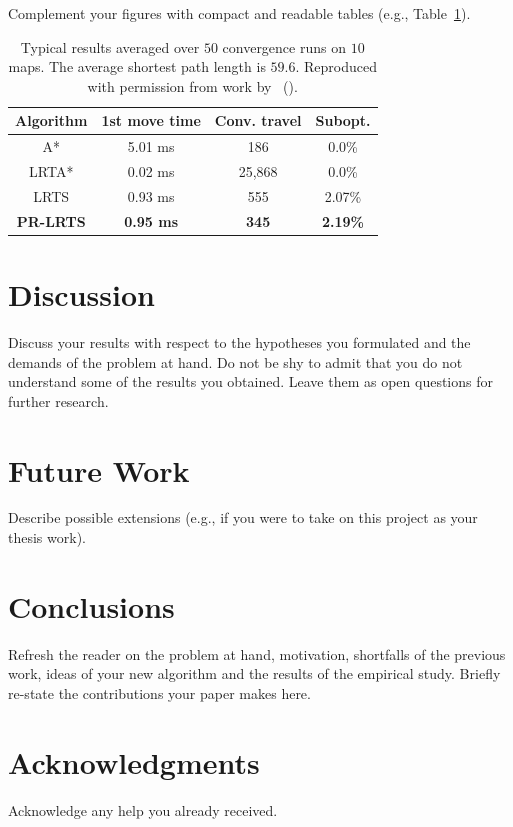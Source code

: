 \documentclass[letterpaper]{article}
\newcommand{\citea}[1]{\citeauthor{#1} (\citeyear{#1})}
\numberwithin{equation}{section}
\numberwithin{theorem}{section}
\numberwithin{lemma}{section}
\numberwithin{df}{section}
\begin{document}
Complement your figures with compact and readable tables (e.g., Table~\ref{tab:PRLRTS-cummulative}). 

\begin{table}[t]
\caption{\small Typical results averaged over $50$ convergence runs on $10$ maps. The average shortest path length is $59.6$. Reproduced with permission from work by~\citea{Bulitko:05b}.}\label{tab:PRLRTS-cummulative}
\vspace{0.1cm}
{\small \begin{center}
\begin{tabular}{c|c|c|c}
\hline
 Algorithm & 1st move time & Conv. travel & Subopt. \\ \hline
A* & 5.01 ms & 186 & 0.0\% \\
LRTA* & 0.02 ms & 25,868 &  0.0\% \\
LRTS & 0.93 ms & 555 &  2.07\% \\
{\bf PR-LRTS} & {\bf 0.95 ms} & {\bf 345} & {\bf 2.19\%} \\
\hline
\end{tabular}
\end{center}}
\end{table}



\section{Discussion}

Discuss your results with respect to the hypotheses you formulated and the demands of the problem at hand. Do not be shy to admit that you do not understand some of the results you obtained. Leave them as open questions for further research. 

\section{Future Work}

Describe possible extensions (e.g., if you were to take on this project as your thesis work).

\section{Conclusions}

Refresh the reader on the problem at hand, motivation, shortfalls of the previous work, ideas of your new algorithm and the results of the empirical study. Briefly re-state the contributions your paper makes here. 


\section*{Acknowledgments}

Acknowledge any help you already received. 



\end{document}
